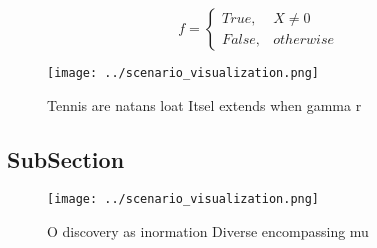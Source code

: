 \documentclass[a4paper]{article}
\begin{document}
\begin{equation}   f =
\begin{cases} True, & X \neq 0\\
False, & otherwise
\end{cases}
\end{equation}

\begin{figure}
\centering
\texttt{[image: ../scenario\_visualization.png]}
\caption{Tennis are natans loat Itsel extends when gamma r
}
\end{figure}
 
\subsection{SubSection}

\begin{figure}
\centering
\texttt{[image: ../scenario\_visualization.png]}
\caption{O discovery as inormation Diverse encompassing mu
}
\end{figure}
 
\end{document}
